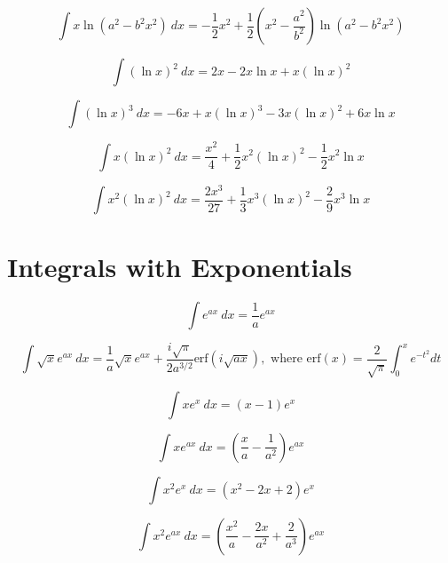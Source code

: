 \documentclass[12pt,letterpaper,leqno]{article}
\begin{document}
\begin{equation}
\int x \ln \left ( a^2 - b^2 x^2 \right )\ dx = -\frac{1}{2}x^2+ 
\frac{1}{2}\left( x^2 - \frac{a^2}{b^2} \right ) \ln \left (a^2 -b^2 x^2 \right) 
\end{equation}

\begin{equation}
\int (\ln x)^2\ dx = 2x - 2x \ln x + x (\ln x)^2
\end{equation}


\begin{equation}
\int (\ln x)^3\ dx = -6 x+x (\ln x)^3-3 x (\ln x)^2+6 x \ln x
\end{equation}
 
 
\begin{equation}
\int x (\ln x)^2\ dx = \frac{x^2}{4}+\frac{1}{2} x^2 (\ln x)^2-\frac{1}{2} x^2 \ln x
\end{equation}

\begin{equation}
\int x^2 (\ln x)^2\ dx = \frac{2 x^3}{27}+\frac{1}{3} x^3 (\ln x)^2-\frac{2}{9} x^3 \ln x
\end{equation}
 
 
 \section*{Integrals with Exponentials}

\begin{equation}
\int e^{ax}\ dx = \frac{1}{a}e^{ax} 
\end{equation}

\begin{equation}\label{eq:ajoy}
\int \sqrt{x} e^{ax}\ dx = \frac{1}{a}\sqrt{x}e^{ax} 
+\frac{i\sqrt{\pi}}{2a^{3/2}}
\text{erf}\left(i\sqrt{ax}\right),
\text{ where erf}(x)=\frac{2}{\sqrt{\pi}}\int_0^x e^{-t^2}dt
\end{equation}

\begin{equation}
\int x e^x\ dx = (x-1) e^x 
\end{equation}

\begin{equation}
\int x e^{ax}\ dx = \left(\frac{x}{a}-\frac{1}{a^2}\right) e^{ax} 
\end{equation}

\begin{equation}
\int x^2 e^{x}\ dx = \left(x^2 - 2x + 2\right) e^{x}
\end{equation}

\begin{equation}
\int x^2 e^{ax}\ dx = \left(\frac{x^2}{a}-\frac{2x}{a^2}+\frac{2}{a^3}\right) e^{ax} 
\end{equation}
\end{document}
